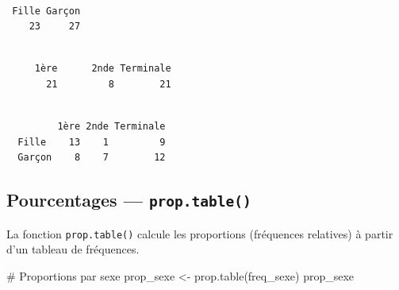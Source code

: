 \documentclass[
  french,
  11pt,
  a4paper,
]{article}
\newenvironment{Shaded}{}{}
\newcommand{\CommentTok}[1]{\textcolor[rgb]{0.42,0.45,0.49}{#1}}
\newcommand{\FunctionTok}[1]{\textcolor[rgb]{0.44,0.26,0.76}{#1}}
\newcommand{\NormalTok}[1]{\textcolor[rgb]{0.14,0.16,0.18}{#1}}
\newcommand{\OtherTok}[1]{\textcolor[rgb]{0.44,0.26,0.76}{#1}}
\newcommand{\SpecialCharTok}[1]{\textcolor[rgb]{0.00,0.36,0.77}{#1}}
\begin{document}
\begin{verbatim}

 Fille Garçon 
    23     27 
\end{verbatim}

\begin{Shaded}
\end{Shaded}

\begin{verbatim}

     1ère      2nde Terminale 
       21         8        21 
\end{verbatim}

\begin{Shaded}
\end{Shaded}

\begin{verbatim}
        
         1ère 2nde Terminale
  Fille    13    1         9
  Garçon    8    7        12
\end{verbatim}

\subsection{\texorpdfstring{Pourcentages ---
\texttt{prop.table()}}{Pourcentages --- prop.table()}}\label{pourcentages-prop.table}

La fonction \texttt{prop.table()} calcule les proportions (fréquences
relatives) à partir d'un tableau de fréquences.

\begin{Shaded}
\begin{Highlighting}[]
\CommentTok{\# Proportions par sexe}
\NormalTok{prop\_sexe }\OtherTok{\textless{}{-}} \FunctionTok{prop.table}\NormalTok{(freq\_sexe)}
\NormalTok{prop\_sexe}
\end{Highlighting}
\end{Shaded}
\end{document}
